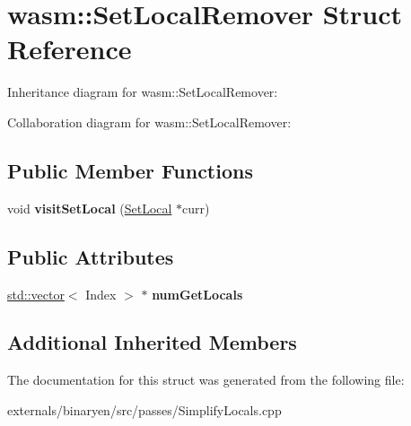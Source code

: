 \hypertarget{structwasm_1_1_set_local_remover}{}\section{wasm\+:\+:Set\+Local\+Remover Struct Reference}
\label{structwasm_1_1_set_local_remover}


Inheritance diagram for wasm\+:\+:Set\+Local\+Remover\+:


Collaboration diagram for wasm\+:\+:Set\+Local\+Remover\+:
\subsection*{Public Member Functions}
\begin{DoxyCompactItemize}
\item 
\mbox{\label{structwasm_1_1_set_local_remover_a1924cce69a0b2ffcef8b14418ac0b798}} 
void {\bfseries visit\+Set\+Local} (\mbox{\hyperlink{classwasm_1_1_set_local}{Set\+Local}} $\ast$curr)
\end{DoxyCompactItemize}
\subsection*{Public Attributes}
\begin{DoxyCompactItemize}
\item 
\mbox{\label{structwasm_1_1_set_local_remover_ada1c20d7f0620f6a0e5004f5a221defa}} 
\mbox{\hyperlink{classstd_1_1vector}{std\+::vector}}$<$ Index $>$ $\ast$ {\bfseries num\+Get\+Locals}
\end{DoxyCompactItemize}
\subsection*{Additional Inherited Members}


The documentation for this struct was generated from the following file\+:\begin{DoxyCompactItemize}
\item 
externals/binaryen/src/passes/Simplify\+Locals.\+cpp\end{DoxyCompactItemize}
